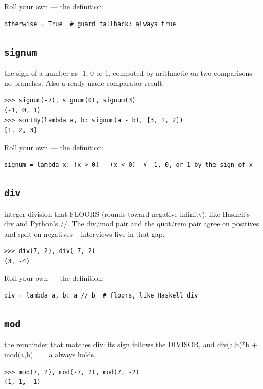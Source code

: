 \documentclass[10pt,letterpaper]{book}
\begin{document}
Roll your own --- the definition:

\begin{lstlisting}[style=ex]
otherwise = True  # guard fallback: always true
\end{lstlisting}

\subsection{\texttt{signum}}\label{def:signum}
the sign of a number as -1, 0 or 1, computed by arithmetic on two comparisons -- no branches. Also a ready-made comparator result.
\begin{lstlisting}[style=ex]
>>> signum(-7), signum(0), signum(3)
(-1, 0, 1)
>>> sortBy(lambda a, b: signum(a - b), [3, 1, 2])
[1, 2, 3]
\end{lstlisting}

Roll your own --- the definition:

\begin{lstlisting}[style=ex]
signum = lambda x: (x > 0) - (x < 0)  # -1, 0, or 1 by the sign of x
\end{lstlisting}

\subsection{\texttt{div}}\label{def:div}
integer division that FLOORS (rounds toward negative infinity), like Haskell's div and Python's //. The div/mod pair and the quot/rem pair agree on positives and split on negatives -- interviews live in that gap.
\begin{lstlisting}[style=ex]
>>> div(7, 2), div(-7, 2)
(3, -4)
\end{lstlisting}

Roll your own --- the definition:

\begin{lstlisting}[style=ex]
div = lambda a, b: a // b  # floors, like Haskell div
\end{lstlisting}
\subsection{\texttt{mod}}\label{def:mod}
the remainder that matches div: its sign follows the DIVISOR, and div(a,b)*b + mod(a,b) == a always holds.
\begin{lstlisting}[style=ex]
>>> mod(7, 2), mod(-7, 2), mod(7, -2)
(1, 1, -1)
\end{lstlisting}
\end{document}
